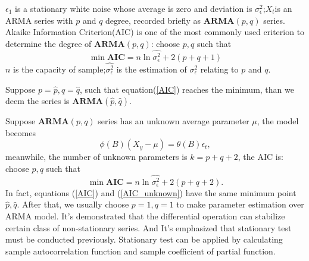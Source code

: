 \documentclass{mcmthesis}
\numberwithin{figure}{section}
\numberwithin{table}{section}
\numberwithin{equation}{section}
\begin{document}
$ \epsilon_1 $ is a stationary white noise whose average is zero and
deviation is $ \sigma_\epsilon^2 $;$ X_t $is an ARMA series with $ p $ and $ q $
degree, recorded briefly as $ \mathbf{ARMA}(p,q) $ series.
Akaike Information Criterion(AIC) is one of the most commonly used
criterion to determine the degree of $ \mathbf{ARMA}(p,q) $: choose 
$ p,q $ such that 
\begin{equation}\label{AIC}
    \min \mathbf{AIC} = n\ln \hat{\sigma_\epsilon^2}+ 2(p+q+1)
\end{equation}
$ n $ is the capacity of sample;$ \hat{\sigma_\epsilon^2} $ is the
estimation of $ \sigma_\epsilon^2 $ relating to $ p $ and $ q $.
\par
Suppose $ p = \hat{p}, q = \hat{q} $, such that equation(\ref{AIC}) reaches the minimum,
than we deem the series is $ \mathbf{ARMA}(\hat{p},\hat{q}) $. 
\par
Suppose $ \mathbf{ARMA}(p,q) $ series has an unknown average parameter $ \mu $,
the model becomes
$$
  \phi(B)(X_y-\mu) = \theta(B)\epsilon_t,
$$   
meanwhile, the number of unknown parameters is $ k = p+q+2 $, the AIC is:
choose $ p,q $ such that
\begin{equation}\label{AIC_unknown}
  \min \mathbf{AIC} = n\ln\hat{\sigma_\epsilon^2}+2(p+q+2).
\end{equation}  
In fact, equations (\ref{AIC}) and (\ref{AIC_unknown}) have the same minimum point $ \hat{p},\hat{q} $.
After that, we usually choose $ p = 1, q = 1 $ to make parameter estimation 
over ARMA model.
It's demonstrated that the differential operation can stabilize 
certain class of non-stationary series. And It's emphasized that 
stationary test must be conducted previously. Stationary test can 
be applied by calculating sample autocorrelation function and 
sample coefficient of partial function. 
\end{document}
